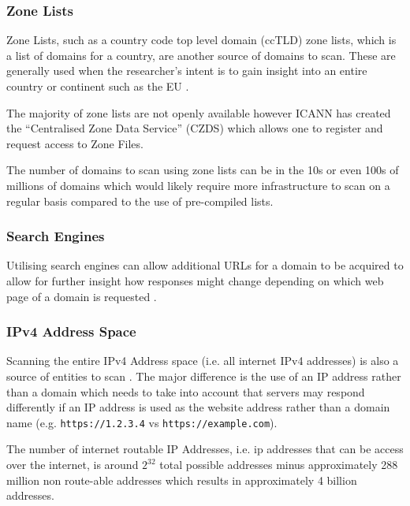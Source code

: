 \documentclass{mscreport}
\begin{document}
\subsubsection{Zone Lists}

Zone Lists, such as a country code top level domain (ccTLD) zone lists, which is a list of domains for a country, are another source of domains to scan. These are generally used when the researcher's intent is to gain insight into an entire country or continent such as the EU \cite{Amann2017-co,Chen2016-dl,Van_Goethem2014-ao,Holz2020-ha}.

\vspace{0.3cm} \noindent
The majority of zone lists are not openly available however ICANN has created the ``Centralised Zone Data Service'' (CZDS) \cite{noauthor_undated-mm} which allows one to register and request access to Zone Files.

\vspace{0.3cm} \noindent
The number of domains to scan using zone lists can be in the 10s or even 100s of millions of domains which would likely require more infrastructure to scan on a regular basis compared to the use of pre-compiled lists.

\subsubsection{Search Engines}

Utilising search engines can allow additional URLs for a domain to be acquired to allow for further insight how responses might change depending on which web page of a domain is requested \cite{Chen2016-dl}.

\subsubsection{IPv4 Address Space}

Scanning the entire IPv4 Address space (i.e. all internet  IPv4 addresses) is also a source of entities to scan \cite{Kotzias2018-wd}. The major difference is the use of an IP address rather than a domain which needs to take into account that servers may respond differently if an IP address is used as the website address rather than a domain name (e.g. \texttt{https://1.2.3.4} vs \texttt{https://example.com}).

\vspace{0.3cm} \noindent
The number of internet routable IP Addresses, i.e. ip addresses that can be access over the internet, is around \(2^{32}\) total possible addresses minus approximately 288 million non route-able addresses which results in approximately 4 billion addresses.
\end{document}
